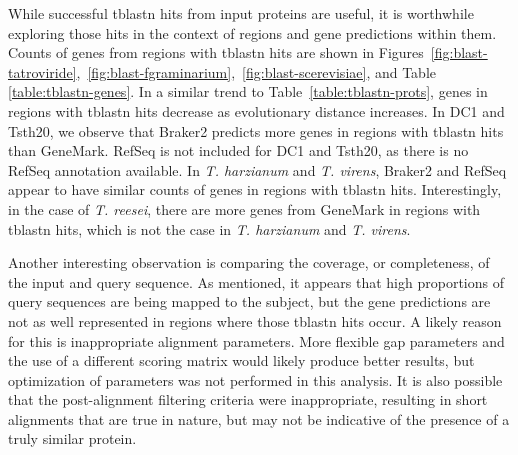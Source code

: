 While successful tblastn hits from input proteins are useful, it is
worthwhile exploring those hits in the context of regions and gene
predictions within them. Counts of genes from regions with tblastn
hits are shown in Figures~\ref{fig:blast-tatroviride},~\ref{fig:blast-fgraminarium},~\ref{fig:blast-scerevisiae}, and Table \ref{table:tblastn-genes}. In a similar trend
to Table~\ref{table:tblastn-prots}, genes in regions with tblastn hits
decrease as evolutionary distance increases. In DC1 and Tsth20, we
observe that Braker2 predicts more genes in regions with tblastn hits
than GeneMark. RefSeq is not included for DC1 and Tsth20, as there is
no RefSeq annotation available. In \textit{T. harzianum} and
\textit{T. virens}, Braker2 and RefSeq appear to have similar counts
of genes in regions with tblastn hits. Interestingly, in the case of
\textit{T. reesei}, there are more genes from GeneMark in regions with
tblastn hits, which is not the case in \textit{T. harzianum} and
\textit{T. virens}.

Another interesting observation is comparing the coverage, or
completeness, of the input and query sequence. As mentioned, it
appears that high proportions of query sequences are being mapped to
the subject, but the gene predictions are not as well represented in
regions where those tblastn hits occur. A likely reason for this is
inappropriate alignment parameters. More flexible gap parameters and
the use of a different scoring matrix would likely produce better
results, but optimization of parameters was not performed in this
analysis. It is also possible that the post-alignment filtering
criteria were inappropriate, resulting in short alignments that are
true in nature, but may not be indicative of the presence of a truly
similar protein.

